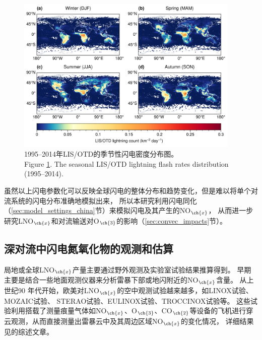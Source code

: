 \begin{figure}[H]
\centering
\includegraphics[width=0.95\textwidth]{./figures/lisotd_season.png}
\caption{1995--2014年LIS/OTD的季节性闪电密度分布图。\\
Figure \ref{fig:lisotd_season}. The seasonal LIS/OTD lightning flash rates distribution (1995--2014).
}
\label{fig:lisotd_season}
\end{figure}

虽然以上闪电参数化可以反映全球闪电的整体分布和趋势变化，但是难以将单个对流系统的闪电分布准确地模拟出来，
所以本研究利用闪电同化（\ref{sec:model_settings_china}节）来模拟闪电及其产生的NO$_{\ch{x}}$，
从而进一步研究LNO$_{\ch{x}}$和对流输送对O$_{\ch{3}}$的影响（\ref{sec:convec_impacts}节）。


\subsection{深对流中闪电氮氧化物的观测和估算} \label{sec:intro_lnox}

局地或全球LNO$_{\ch{x}}$产量主要通过野外观测及实验室试验结果推算得到。
早期主要是结合一些地面观测仪器来分析雷暴下部或地闪附近的NO$_{\ch{x}}$含量。
从上世纪90 年代开始，欧美对LNO$_{\ch{x}}$的空中观测试验越来越多，如LINOX试验\citep{Huntrieser.1998}、 MOZAIC试验\citep{Marenco.1998}、
STERAO试验\citep{Dye.2000}、EULINOX试验\citep{Holler.2000}、TROCCINOX试验\citep{Huntrieser.2007}等。
这些试验利用搭载了测量痕量气体如NO$_{\ch{x}}$、O$_{\ch{3}}$、CO$_{\ch{2}}$等设备的飞机进行穿云观测，从而直接测量出雷暴云中及其周边区域NO$_{\ch{x}}$的变化情况，
详细结果见\citet{Schumann.2007}的综述文章。

